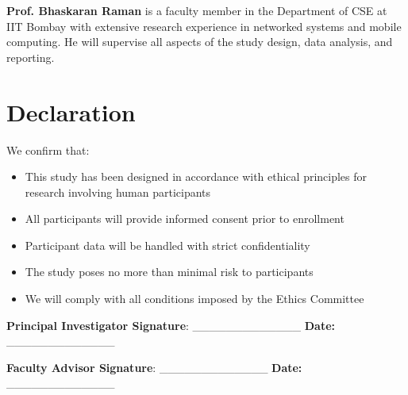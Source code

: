 \documentclass[12pt,a4paper]{article}
\begin{document}
\textbf{Prof. Bhaskaran Raman} is a faculty member in the Department of CSE at IIT Bombay with extensive research experience in networked systems and mobile computing. He will supervise all aspects of the study design, data analysis, and reporting.
\section{Declaration}
We confirm that:
\begin{itemize}
    \item This study has been designed in accordance with ethical principles for research involving human participants
    \item All participants will provide informed consent prior to enrollment
    \item Participant data will be handled with strict confidentiality
    \item The study poses no more than minimal risk to participants
    \item We will comply with all conditions imposed by the Ethics Committee
\end{itemize}
\textbf{Principal Investigator Signature}: \_\_\_\_\_\_\_\_\_\_\_\_\_ \textbf{Date:} \_\_\_\_\_\_\_\_\_\_\_\_\_

\textbf{Faculty Advisor Signature}: \_\_\_\_\_\_\_\_\_\_\_\_\_ \textbf{Date:} \_\_\_\_\_\_\_\_\_\_\_\_\_


\end{document}
